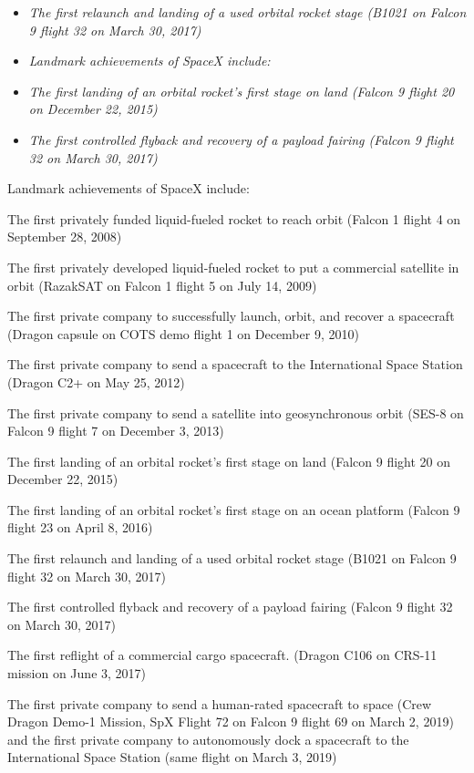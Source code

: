 \begin{itemize}
\item
  \emph{The first relaunch and landing of a used orbital rocket stage
  (B1021 on Falcon 9 flight 32 on March 30, 2017)}
\item
  \emph{Landmark achievements of SpaceX include:}
\item
  \emph{The first landing of an orbital rocket's first stage on land
  (Falcon 9 flight 20 on December 22, 2015)}
\item
  \emph{The first controlled flyback and recovery of a payload fairing
  (Falcon 9 flight 32 on March 30, 2017)}
\end{itemize}

Landmark achievements of SpaceX include:

The first privately funded liquid-fueled rocket to reach orbit (Falcon 1
flight 4 on September 28, 2008)

The first privately developed liquid-fueled rocket to put a commercial
satellite in orbit (RazakSAT on Falcon 1 flight 5 on July 14, 2009)

The first private company to successfully launch, orbit, and recover a
spacecraft (Dragon capsule on COTS demo flight 1 on December 9, 2010)

The first private company to send a spacecraft to the International
Space Station (Dragon C2+ on May 25, 2012)

The first private company to send a satellite into geosynchronous orbit
(SES-8 on Falcon 9 flight 7 on December 3, 2013)

The first landing of an orbital rocket's first stage on land (Falcon 9
flight 20 on December 22, 2015)

The first landing of an orbital rocket's first stage on an ocean
platform (Falcon 9 flight 23 on April 8, 2016)

The first relaunch and landing of a used orbital rocket stage (B1021 on
Falcon 9 flight 32 on March 30, 2017)

The first controlled flyback and recovery of a payload fairing (Falcon 9
flight 32 on March 30, 2017)

The first reflight of a commercial cargo spacecraft. (Dragon C106 on
CRS-11 mission on June 3, 2017)

The first private company to send a human-rated spacecraft to space
(Crew Dragon Demo-1 Mission, SpX Flight 72 on Falcon 9 flight 69 on
March 2, 2019) and the first private company to autonomously dock a
spacecraft to the International Space Station (same flight on March 3,
2019)

